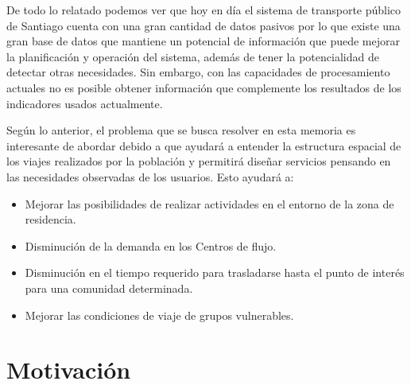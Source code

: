 \documentclass[12pt]{article}
\begin{document}
    De todo lo relatado podemos ver que hoy en día el sistema de transporte público de Santiago cuenta con una gran cantidad de datos pasivos por lo que existe una gran base de datos que mantiene un potencial de información que puede mejorar la planificación y operación del sistema, además de tener la potencialidad de detectar otras necesidades. Sin embargo, con las capacidades de procesamiento actuales no es posible obtener información que complemente los resultados de los indicadores usados actualmente.

    Según lo anterior, el problema que se busca resolver en esta memoria es interesante de abordar debido a que ayudará a entender la estructura espacial de los viajes realizados por la población y permitirá diseñar servicios pensando en las necesidades observadas de los usuarios. Esto ayudará a:

    \begin{itemize}
    \item Mejorar las posibilidades de realizar actividades en el entorno de la zona de residencia.
    \item Disminución de la demanda en los Centros de flujo.
    \item Disminución en el tiempo requerido para trasladarse hasta el punto de interés para una comunidad determinada.
    \item Mejorar las condiciones de viaje de grupos vulnerables.
    \end{itemize}



    \newpage
    \section{Motivación}
\end{document}
